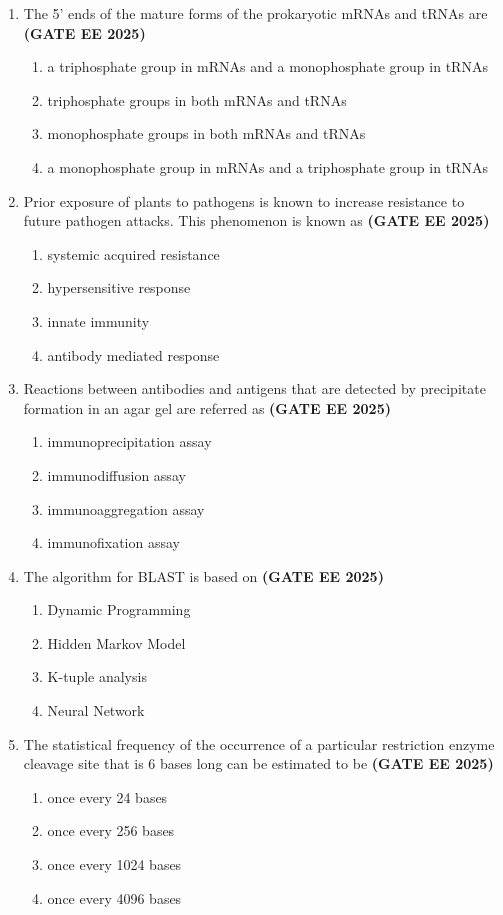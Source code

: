 \documentclass[journal,12pt,onecolumn]{IEEEtran}
\theoremstyle{remark}
\begin{document}
\begin{enumerate}
\item The 5' ends of the mature forms of the prokaryotic mRNAs and tRNAs are \hfill \textbf{(GATE EE 2025)}  
\begin{enumerate} 
\item a triphosphate group in mRNAs and a monophosphate group in tRNAs
\item triphosphate groups in both mRNAs and tRNAs
\item monophosphate groups in both mRNAs and tRNAs
\item a monophosphate group in mRNAs and a triphosphate group in tRNAs
\end{enumerate}

\item Prior exposure of plants to pathogens is known to increase resistance to future pathogen attacks. This phenomenon is known as \hfill \textbf{(GATE EE 2025)} 
\begin{enumerate} 
\item systemic acquired resistance
\item hypersensitive response
\item innate immunity
\item antibody mediated response
\end{enumerate}

\item Reactions between antibodies and antigens that are detected by precipitate formation in an agar gel are referred as  \hfill \textbf{(GATE EE 2025)}
\begin{enumerate} 
\item immunoprecipitation assay
\item immunodiffusion assay
\item immunoaggregation assay
\item immunofixation assay
\end{enumerate}

\item The algorithm for BLAST is based on  \hfill \textbf{(GATE EE 2025)}
\begin{enumerate} 
\item Dynamic Programming
\item Hidden Markov Model
\item K-tuple analysis
\item Neural Network
\end{enumerate}

\item The statistical frequency of the occurrence of a particular restriction enzyme cleavage site that is 6 bases long can be estimated to be  \hfill \textbf{(GATE EE 2025)}
\begin{enumerate} 
\item once every 24 bases
\item once every 256 bases
\item once every 1024 bases
\item once every 4096 bases
\end{enumerate}


\end{enumerate}
\end{document}
